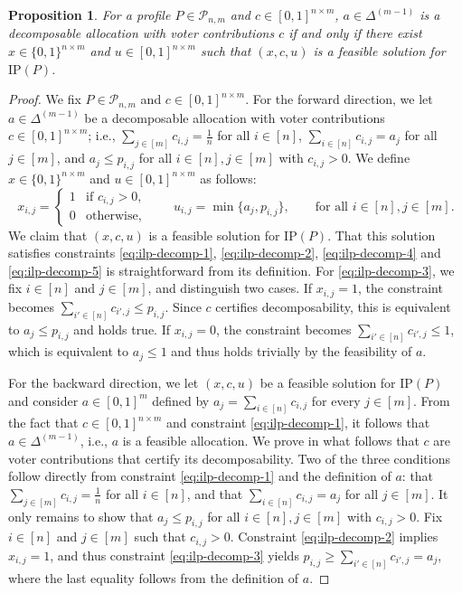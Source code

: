 \documentclass[11pt]{article}
\newtheorem{proposition}{Proposition}
\begin{document}
\begin{proposition}\label{prop:ilp-decomp}
    For a profile $P\in \mathcal{P}_{n,m}$ and $c\in [0,1]^{n\times m}$, 
    $a\in \Delta^{(m-1)}$ is a decomposable allocation with voter contributions $c$ if and only if there exist $x\in \{0,1\}^{n\times m}$ and $u\in [0,1]^{n\times m}$ such that $(x,c,u)$ is a feasible solution  for $\mathrm{IP}(P)$. 
\end{proposition}

\begin{proof}
    We fix $P\in \mathcal{P}_{n,m}$ and $c\in [0,1]^{n\times m}$.
    For the forward direction, we let $a\in \Delta^{(m-1)}$ be a decomposable allocation with voter contributions $c\in [0,1]^{n\times m}$; i.e., $\sum_{j\in [m]}c_{i,j}=\frac{1}{n}$ for all $i\in [n]$, $\sum_{i\in [n]}c_{i,j}=a_j$ for all $j\in [m]$, and $a_j\leq p_{i,j}$ for all $i\in[n],j\in[m]$ with $c_{i,j}>0$. 
    We define $x\in \{0,1\}^{n\times m}$ and $u\in [0,1]^{n\times m}$ as follows:
    \[
        x_{i,j} = \begin{cases}
            1 & \text{if } c_{i,j} > 0,\\
            0 & \text{otherwise,}
        \end{cases} \qquad
        u_{i,j} = \min\{ a_{j}, p_{i,j} \}, \qquad \text{for all } i\in [n], j\in [m].
    \]
    We claim that $(x,c,u)$ is a feasible solution for $\mathrm{IP}(P)$.
    That this solution satisfies constraints \eqref{eq:ilp-decomp-1}, \eqref{eq:ilp-decomp-2},  \eqref{eq:ilp-decomp-4} and \eqref{eq:ilp-decomp-5} is straightforward from its definition.
    For \eqref{eq:ilp-decomp-3}, we fix $i\in [n]$ and $j\in [m]$, and distinguish two cases.
    If $x_{i,j}=1$, the constraint becomes $\sum_{i'\in [n]}c_{i',j}\leq p_{i,j}$. Since $c$ certifies decomposability, this is equivalent to $a_{j}\leq p_{i,j}$ and holds true.
    If $x_{i,j}=0$, the constraint becomes $\sum_{i'\in [n]}c_{i',j}\leq 1$, which is equivalent to $a_{j}\leq 1$ and thus holds trivially by the feasibility of $a$.

    For the backward direction, we let $(x,c,u)$ be a feasible solution for $\mathrm{IP}(P)$ and consider $a\in [0,1]^{m}$ defined by $a_j=\sum_{i\in [n]} c_{i,j}$ for every $j\in [m]$.
    From the fact that $c\in [0,1]^{n\times m}$ and constraint \eqref{eq:ilp-decomp-1}, it follows that $a\in \Delta^{(m-1)}$, i.e., $a$ is a feasible allocation. 
    We prove in what follows that $c$ are voter contributions that certify its decomposability. 
    Two of the three conditions follow directly from constraint  \eqref{eq:ilp-decomp-1} and the definition of $a$: that $\sum_{j\in [m]}c_{i,j}=\frac{1}{n}$ for all $i\in [n]$, and that $\sum_{i\in [n]}c_{i,j}=a_j$ for all $j\in [m]$.
    It only remains to show that $a_j\leq p_{i,j}$ for all $i\in[n],j\in[m]$ with $c_{i,j}>0$. 
    Fix $i\in [n]$ and $j\in [m]$ such that $c_{i,j}>0$. 
    Constraint \eqref{eq:ilp-decomp-2} implies $x_{i,j}=1$, and thus constraint \eqref{eq:ilp-decomp-3} yields $p_{i,j} \geq \sum_{i'\in [n]}c_{i',j}=a_j$, where the last equality follows from the definition of $a$.
\end{proof}
\end{document}
